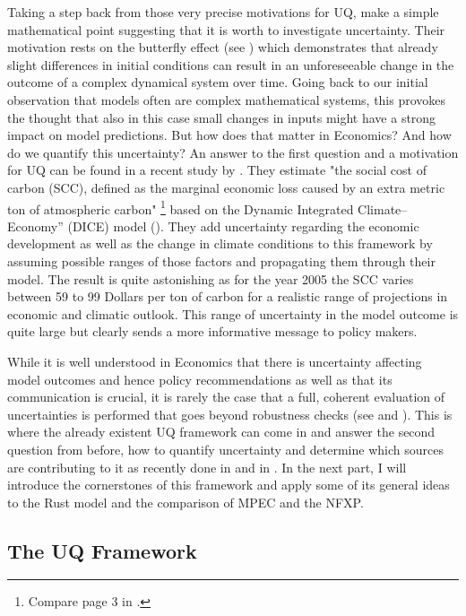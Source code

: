 Taking a step back from those very precise motivations for UQ, \cite{Smith.2019} make a simple mathematical point suggesting that it is worth to investigate uncertainty. Their motivation rests on the butterfly effect (see \cite{Lorenz.1963}) which demonstrates that already slight differences in initial conditions can result in an unforeseeable change in the outcome of a complex dynamical system over time. Going back to our initial observation that models often are complex mathematical systems, this provokes the thought that also in this case small changes in inputs might have a strong impact on model predictions. But how does that matter in Economics? And how do we quantify this uncertainty? An answer to the first question and a motivation for UQ can be found in a recent study by \cite{Cai.2019}. They estimate "the social cost of carbon (SCC), defined as the marginal economic loss caused by an extra metric ton of atmospheric carbon" \footnote{Compare page 3 in \cite{Cai.2019}.} based on the Dynamic Integrated Climate–Economy” (DICE) model (\cite{Nordhaus.1992, Nordhaus.2008}). They add uncertainty regarding the economic development as well as the change in climate conditions to this framework by assuming possible ranges of those factors and propagating them through their model. The result is quite astonishing as for the year 2005 the SCC varies between 59 to 99 Dollars per ton of carbon for a realistic range of projections in economic and climatic outlook. This range of uncertainty in the model outcome is quite large but clearly sends a more informative message to policy makers.

While it is well understood in Economics that there is uncertainty affecting model outcomes and hence policy recommendations as well as that its communication is crucial, it is rarely the case that a full, coherent evaluation of uncertainties is performed that goes beyond robustness checks (see \cite{Manski.2019} and \cite{Scheidegger.2019}). This is where the already existent UQ framework can come in and answer the second question from before, how to quantify uncertainty and determine which sources are contributing to it as recently done in \cite{Scheidegger.2019} and in \cite{Harenberg.2019}. In the next part, I will introduce the cornerstones of this framework and apply some of its general ideas to the Rust model and the comparison of MPEC and the NFXP.

\subsection{The UQ Framework}

